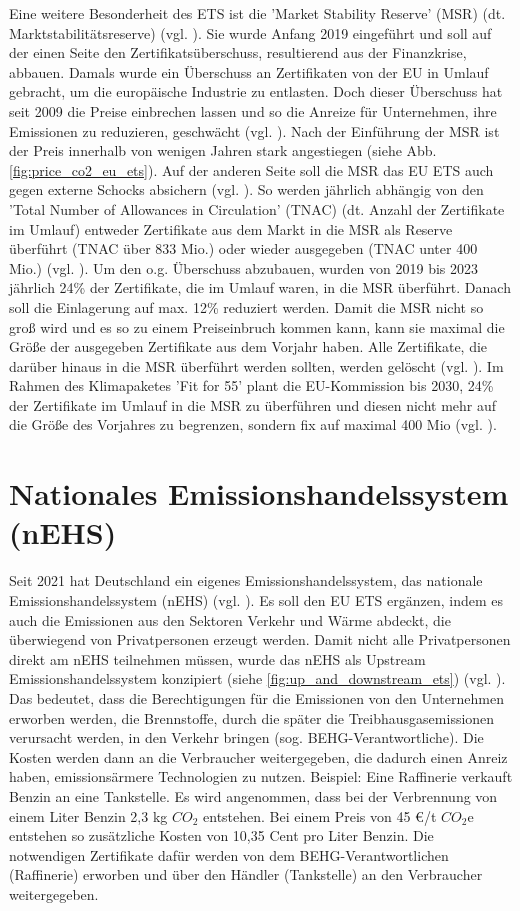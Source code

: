 Eine weitere Besonderheit des ETS ist die 'Market Stability Reserve' (MSR) (dt. Marktstabilitätsreserve) (vgl. \cite{eu3.2023}). Sie wurde Anfang 2019 eingeführt und soll auf der einen Seite den Zertifikatsüberschuss, resultierend aus der Finanzkrise, abbauen.
Damals wurde ein Überschuss an Zertifikaten von der EU in Umlauf gebracht, um die europäische Industrie zu entlasten.
Doch dieser Überschuss hat seit 2009 die Preise einbrechen lassen und so die Anreize für Unternehmen, ihre Emissionen zu reduzieren, geschwächt (vgl. \cite{eu3.2023}). Nach der Einführung der MSR ist der Preis innerhalb von wenigen Jahren stark angestiegen (siehe Abb. \ref{fig:price_co2_eu_ets}).
Auf der anderen Seite soll die MSR das EU ETS auch gegen externe Schocks absichern (vgl. \cite{eu3.2023}).
So werden jährlich abhängig von den 'Total Number of Allowances in Circulation' (TNAC) (dt. Anzahl der Zertifikate im Umlauf) entweder Zertifikate aus dem Markt in die MSR als Reserve überführt (TNAC über 833 Mio.) oder wieder ausgegeben (TNAC unter 400 Mio.) (vgl. \cite[S. 7]{icap2.2023}).
Um den o.g. Überschuss abzubauen, wurden von 2019 bis 2023 jährlich 24\% der Zertifikate, die im Umlauf waren, in die MSR überführt.
Danach soll die Einlagerung auf max. 12\% reduziert werden. Damit die MSR nicht so groß wird und es so zu einem Preiseinbruch kommen kann, kann sie maximal die Größe der ausgegeben Zertifikate aus dem Vorjahr haben.
Alle Zertifikate, die darüber hinaus in die MSR überführt werden sollten, werden gelöscht (vgl. \cite{eu3.2023}).
Im Rahmen des Klimapaketes 'Fit for 55' plant die EU-Kommission bis 2030, 24\% der Zertifikate im Umlauf in die MSR zu überführen und diesen nicht mehr auf die Größe des Vorjahres zu begrenzen, sondern fix auf maximal 400 Mio (vgl. \cite{ub.2023}).

\section{Nationales Emissionshandelssystem (nEHS)}

Seit 2021 hat Deutschland ein eigenes Emissionshandelssystem, das nationale Emissionshandelssystem (nEHS) (vgl. \cite{dehst.2023}). Es soll den EU ETS ergänzen, indem es auch die Emissionen aus den Sektoren Verkehr und Wärme abdeckt, die überwiegend von Privatpersonen erzeugt werden.
Damit nicht alle Privatpersonen direkt am nEHS teilnehmen müssen, wurde das nEHS als Upstream Emissionshandelssystem konzipiert (siehe \ref{fig:up_and_downstream_ets}) (vgl. \cite{dehst.2023}).
Das bedeutet, dass die Berechtigungen für die Emissionen von den Unternehmen erworben werden, die Brennstoffe, durch die später die Treibhausgasemissionen verursacht werden, in den Verkehr bringen (sog. BEHG-Verantwortliche).
Die Kosten werden dann an die Verbraucher weitergegeben, die dadurch einen Anreiz haben, emissionsärmere Technologien zu nutzen. Beispiel: Eine Raffinerie verkauft Benzin an eine Tankstelle.
Es wird angenommen, dass bei der Verbrennung von einem Liter Benzin 2,3 kg $CO_2$ entstehen. Bei einem Preis von 45 €/t $CO_2$e entstehen so zusätzliche Kosten von 10,35 Cent pro Liter Benzin.
Die notwendigen Zertifikate dafür werden von dem BEHG-Verantwortlichen (Raffinerie) erworben und über den Händler (Tankstelle) an den Verbraucher weitergegeben.

